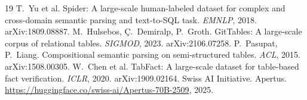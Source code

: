 \documentclass[11pt,a4paper]{article}
\begin{document}
\begin{thebibliography}{19}
 T.~Yu et al. Spider: A large-scale human-labeled dataset for complex and cross-domain semantic parsing and text-to-SQL task. \emph{EMNLP}, 2018. arXiv:1809.08887.
 M.~Hulsebos, \c{C}.~Demiralp, P.~Groth. GitTables: A large-scale corpus of relational tables. \emph{SIGMOD}, 2023. arXiv:2106.07258.
 P.~Pasupat, P.~Liang. Compositional semantic parsing on semi-structured tables. \emph{ACL}, 2015. arXiv:1508.00305.
 W.~Chen et al. TabFact: A large-scale dataset for table-based fact verification. \emph{ICLR}, 2020. arXiv:1909.02164.
 Swiss AI Initiative. Apertus. \url{https://huggingface.co/swiss-ai/Apertus-70B-2509}, 2025.
\end{thebibliography}
\end{document}
